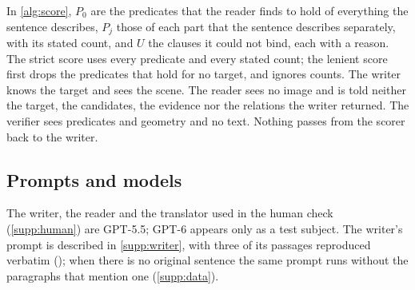 In \cref{alg:score}, $P_0$ are the predicates that the reader finds to hold of everything the sentence describes, $P_j$ those of each part that the sentence describes separately, with its stated count, and $U$ the clauses it could not bind, each with a reason.
The strict score uses every predicate and every stated count; the lenient score first drops the predicates that hold for no target, and ignores counts.
The writer knows the target and sees the scene.
The reader sees no image and is told neither the target, the candidates, the evidence nor the relations the writer returned.
The verifier sees predicates and geometry and no text.
Nothing passes from the scorer back to the writer.

\subsection{Prompts and models}
\label{supp:prompts}
The writer, the reader and the translator used in the human check (\cref{supp:human}) are GPT-5.5; GPT-6 appears only as a test subject.
The writer's prompt is described in \cref{supp:writer}, with three of its passages reproduced verbatim (); when there is no original sentence the same prompt runs without the paragraphs that mention one (\cref{supp:data}).

